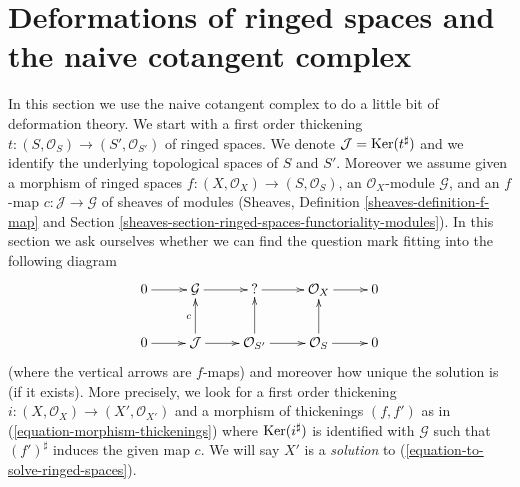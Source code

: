 \section{Deformations of ringed spaces and the naive cotangent complex}
\label{section-deformations-ringed-spaces}

\noindent
In this section we use the naive cotangent complex to do a little bit
of deformation theory. We start with a first order thickening
$t : (S, \mathcal{O}_S) \to (S', \mathcal{O}_{S'})$ of ringed spaces.
We denote $\mathcal{J} = \mathop{\mathrm{Ker}}(t^\sharp)$ and we
identify the underlying topological spaces of $S$ and $S'$.
Moreover we assume given a morphism of ringed spaces
$f : (X, \mathcal{O}_X) \to (S, \mathcal{O}_S)$, an $\mathcal{O}_X$-module
$\mathcal{G}$, and an $f$-map $c : \mathcal{J} \to \mathcal{G}$
of sheaves of modules (Sheaves, Definition \ref{sheaves-definition-f-map}
and Section \ref{sheaves-section-ringed-spaces-functoriality-modules}).
In this section we ask ourselves whether we can find
the question mark fitting into the following diagram
\begin{equation}
\label{equation-to-solve-ringed-spaces}
\vcenter{
\xymatrix{
0 \ar[r] & \mathcal{G} \ar[r] & {?} \ar[r] & \mathcal{O}_X \ar[r] & 0 \\
0 \ar[r] & \mathcal{J} \ar[u]^c \ar[r] & \mathcal{O}_{S'} \ar[u] \ar[r] &
\mathcal{O}_S \ar[u] \ar[r] & 0
}
}
\end{equation}
(where the vertical arrows are $f$-maps)
and moreover how unique the solution is (if it exists). More precisely,
we look for a first order thickening
$i : (X, \mathcal{O}_X) \to (X', \mathcal{O}_{X'})$
and a morphism of thickenings $(f, f')$ as in
(\ref{equation-morphism-thickenings})
where $\mathop{\mathrm{Ker}}(i^\sharp)$ is identified with $\mathcal{G}$
such that $(f')^\sharp$ induces the given map $c$.
We will say $X'$ is a {\it solution} to
(\ref{equation-to-solve-ringed-spaces}).

